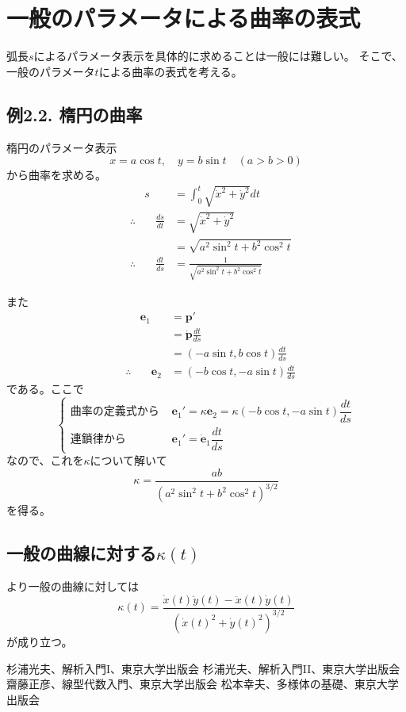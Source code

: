 \documentclass[a4j,disablejfam,dvipdfmx,papersize,slide,uplatex,21pt]{jsarticle}
\begin{document}
\section{一般のパラメータによる曲率の表式}
弧長$s$によるパラメータ表示を具体的に求めることは一般には難しい。
そこで、一般のパラメータ$t$による曲率の表式を考える。

\newpage
\subsection*{例2.2. 楕円の曲率}
楕円のパラメータ表示
\begin{equation}
    x = a \cos t,\quad y = b \sin t \quad (a > b > 0)
\end{equation}
から曲率を求める。
\begin{alignat}{2}
    &&s &= \int_0^t \sqrt{\dot{x}^2 + \dot{y}^2} dt \\
    &\therefore& \quad \frac{ds}{dt} &= \sqrt{\dot{x}^2 + \dot{y}^2} \\
        &&&= \sqrt{a^2 \sin^2 t + b^2 \cos^2 t} \\
    &\therefore& \quad \frac{dt}{ds} &= \frac{1}{\sqrt{a^2 \sin^2 t + b^2 \cos^2 t}}
\end{alignat}

\newpage
また
\begin{alignat}{2}
    &&\bm{e}_1 &= \bm{p}' \\
        &&&= \dot{\bm{p}} \frac{dt}{ds} \\
        &&&= (-a \sin t, b \cos t) \frac{dt}{ds} \\
    &\therefore& \quad \bm{e}_2 &= (-b \cos t, -a \sin t) \frac{dt}{ds}
\end{alignat}
である。ここで
\begin{equation}
    \begin{cases}
        \text{曲率の定義式から } &\bm{e}_1' = \kappa \bm{e}_2 = \kappa (-b \cos t, -a \sin t) \dfrac{dt}{ds} \\
        \text{連鎖律から } &\bm{e}_1' = \dot{\bm{e}}_1 \dfrac{dt}{ds}
    \end{cases}
\end{equation}
なので、これを$\kappa$について解いて
\begin{equation}
    \kappa = \frac{ab}{(a^2 \sin^2 t + b^2 \cos^2 t)^{3/2}}
\end{equation}
を得る。

\newpage
\subsection*{一般の曲線に対する$\kappa(t)$}
より一般の曲線に対しては
\begin{equation}
    \kappa(t) = \frac{\dot{x}(t) \ddot{y}(t) - \ddot{x}(t) \dot{y}(t)}{(\dot{x}(t)^2 + \dot{y}(t)^2)^{3/2}}
\end{equation}
が成り立つ。




\begin{thebibliography}{99}
     杉浦光夫、解析入門I、東京大学出版会
     杉浦光夫、解析入門II、東京大学出版会
     齋藤正彦、線型代数入門、東京大学出版会
     松本幸夫、多様体の基礎、東京大学出版会
\end{thebibliography}
\end{document}
